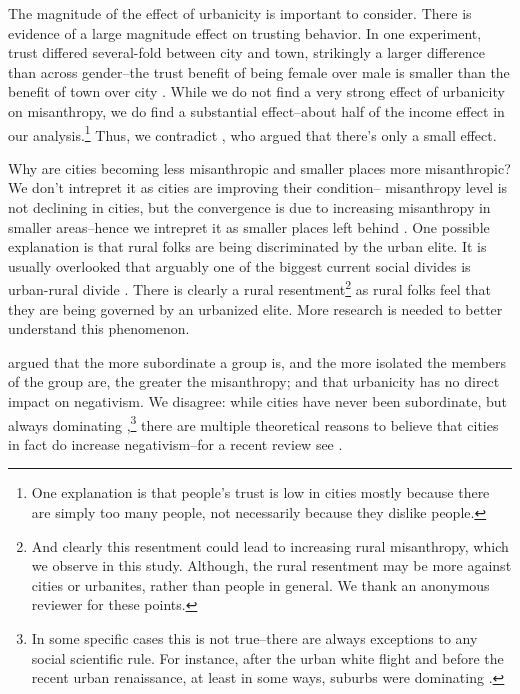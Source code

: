 \documentclass[10pt, letterpaper]{article}
\begin{document}
\begin{spacing}{1.4}
The magnitude of the effect of urbanicity is important to consider. There is
evidence of a large magnitude effect on trusting behavior. In one experiment,
trust differed several-fold between city and town, strikingly a larger
difference than across gender--the trust benefit of being female over male is smaller than the benefit of town over city \citep{milgram70}. While we do not find a very strong effect of urbanicity on misanthropy, we do find a substantial effect--about half of the income effect in our analysis.\footnote{One explanation is that people's trust is low in cities mostly because there are simply too many people, not necessarily because they dislike people.} Thus, we contradict \citet{wilson85}, who argued that there's only a small effect.%

Why are cities becoming less misanthropic and smaller places more misanthropic?
We don't intrepret it as cities are improving their condition--
misanthropy level is not declining in cities, but the convergence is due to
increasing misanthropy in smaller areas--hence we intrepret it as smaller places
left behind \cite{aokCityBook15}.
%
One possible explanation is that rural folks are being discriminated by the
urban elite. It is usually overlooked that arguably one of the biggest current
social divides is urban-rural divide \citep{hansonCityJournalautumn15,hansonCJ17winter17}. There is
 clearly a rural resentment\footnote{And clearly this resentment could lead to increasing rural misanthropy, which we observe in this study. Although, the rural resentment may be more against cities or urbanites, rather than people in general. We thank an anonymous reviewer for these points.} as rural folks feel that they are being governed by an urbanized elite. More research is needed to better understand this phenomenon.

\citet{smith97} argued that the more subordinate a group is, and the more isolated the members of the group are, the greater the misanthropy; and that urbanicity has no direct impact on negativism.  %
We disagree: while cities have never been subordinate, but always dominating \citep[e.g.,][]{aok-sizeFetish17},\footnote{In some specific cases this is not
   true--there are always exceptions to any social scientific rule. For instance, after the urban white flight and before the recent urban renaissance, at least in some ways, suburbs were dominating \citep[e.g.,][]{adams14}.} there are multiple theoretical reasons to believe that cities in fact do increase negativism--for a recent review see \citet{aokCityBook15}. 
   

\end{spacing}
\end{document}
